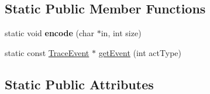 \subsection*{Static Public Member Functions}
\begin{DoxyCompactItemize}
\item 
static void {\bfseries encode} (char $\ast$in, int size)\hypertarget{classRTSim_1_1TraceEvent_af5e2dcd08c809ef322f52671a31871ca}{}\label{classRTSim_1_1TraceEvent_af5e2dcd08c809ef322f52671a31871ca}

\item 
static const \hyperlink{classRTSim_1_1TraceEvent}{Trace\+Event} $\ast$ \hyperlink{classRTSim_1_1TraceEvent_a679a08b6eb225a45c5db82768bbe8106}{get\+Event} (int act\+Type)
\end{DoxyCompactItemize}
\subsection*{Static Public Attributes}

